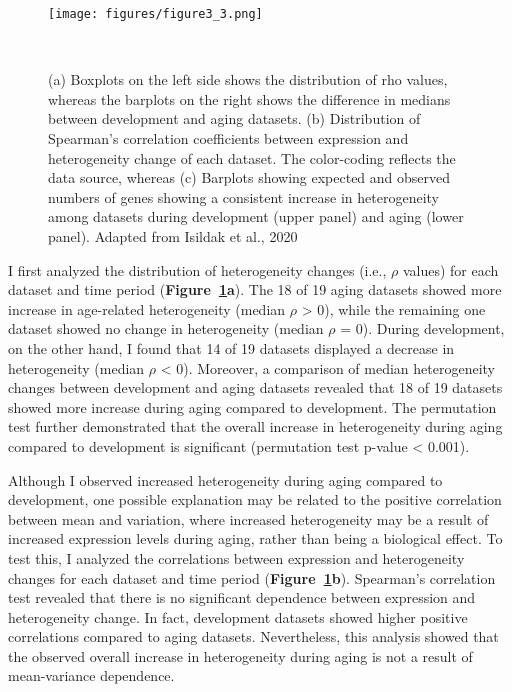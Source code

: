 \begin{figure}[h]
    \centering
    \texttt{[image: figures/figure3\_3.png]}
    \caption{(a) Boxplots on the left side shows the distribution of rho values, 
    whereas the barplots on the right shows the difference in medians between development and aging datasets.
    (b) Distribution of Spearman's correlation coefficients between expression and heterogeneity change of each dataset. 
    The color-coding reflects the data source, whereas 
    (c) Barplots showing expected and observed numbers of genes showing a consistent increase in heterogeneity among datasets during development (upper panel) and aging (lower panel).
    Adapted from Isildak et al., 2020
    }~\label{fig:fig3.3}
\end{figure}

I first analyzed the distribution of heterogeneity changes (i.e., $\rho$ values) for each dataset and time period (\textbf{Figure~\ref{fig:fig3.3}a}).
The 18 of 19 aging datasets showed more increase in age-related heterogeneity (median $\rho$ > 0), 
while the remaining one dataset showed no change in heterogeneity (median $\rho$ = 0). 
During development, on the other hand, I found that 14 of 19 datasets displayed a decrease in heterogeneity  (median $\rho$ < 0).
Moreover, a comparison of median heterogeneity changes between development and aging datasets revealed that 
18 of 19 datasets showed more increase during aging compared to development. 
The permutation test further demonstrated that the overall increase in heterogeneity during aging compared to development is significant (permutation test p-value < 0.001).

Although I observed increased heterogeneity during aging compared to development, 
one possible explanation may be related to the positive correlation between mean and variation, 
where increased heterogeneity may be a result of increased expression levels during aging, rather than being a biological effect.
To test this, I analyzed the correlations between expression and heterogeneity changes for each dataset and time period (\textbf{Figure~\ref{fig:fig3.3}b}).
Spearman's correlation test revealed that there is no significant dependence between expression and heterogeneity change.
In fact, development datasets showed higher positive correlations compared to aging datasets. 
Nevertheless, this analysis showed that the observed overall increase in heterogeneity during aging is not a result of mean-variance dependence.

